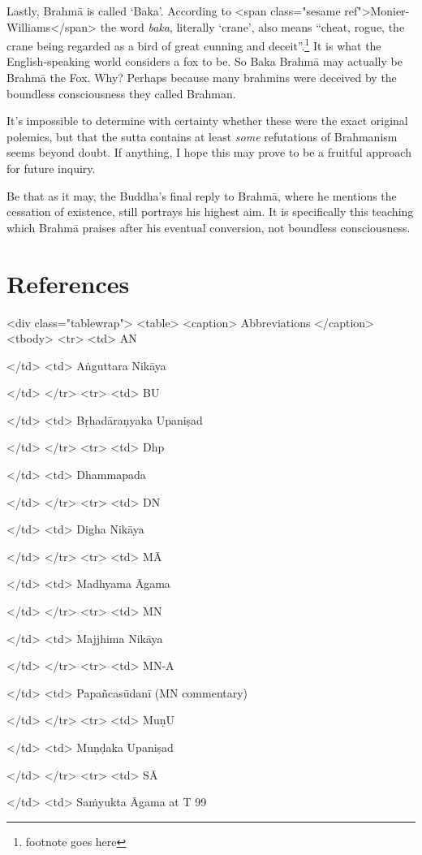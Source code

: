 \documentclass[10pt, openany]{book}
\begin{document}
Lastly, Brahmā is called ‘Baka’. According to <span class="sesame ref">Monier-Williams</span> the word \textit{baka}, literally ‘crane’, also means “cheat, rogue, the crane being regarded as a bird of great cunning and deceit”.\footnote{footnote goes here} It is what the English-speaking world considers a fox to be. So Baka Brahmā may actually be Brahmā the Fox. Why? Perhaps because many brahmins were deceived by the boundless consciousness they called Brahman.


It’s impossible to determine with certainty whether these were the exact original polemics, but that the sutta contains at least \textit{some} refutations of Brahmanism seems beyond doubt. If anything, I hope this may prove to be a fruitful approach for future inquiry.


Be that as it may, the Buddha’s final reply to Brahmā, where he mentions the cessation of existence, still portrays his highest aim. It is specifically this teaching which Brahmā praises after his eventual conversion, not boundless consciousness.


\chapter{References}
<div class="tablewrap">
<table>
<caption>
Abbreviations
</caption>
<tbody>
<tr>
<td>
AN


</td>
<td>
Aṅguttara Nikāya


</td>
</tr>
<tr>
<td>
BU


</td>
<td>
Bṛhadāraṇyaka Upaniṣad


</td>
</tr>
<tr>
<td>
Dhp


</td>
<td>
Dhammapada


</td>
</tr>
<tr>
<td>
DN


</td>
<td>
Digha Nikāya


</td>
</tr>
<tr>
<td>
MĀ


</td>
<td>
Madhyama Āgama


</td>
</tr>
<tr>
<td>
MN


</td>
<td>
Majjhima Nikāya


</td>
</tr>
<tr>
<td>
MN-A


</td>
<td>
Papañcasūdanī (MN commentary)


</td>
</tr>
<tr>
<td>
MuṇU


</td>
<td>
Muṇḍaka Upaniṣad


</td>
</tr>
<tr>
<td>
SĀ


</td>
<td>
Saṁyukta Āgama at T 99
\end{document}

